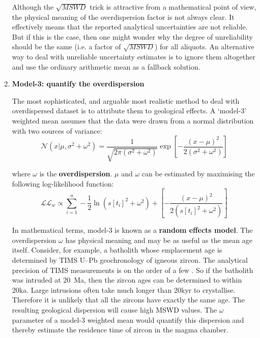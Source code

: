 \begin{refsection}
\begin{enumerate}
  Although the $\sqrt{MSWD}$ trick is attractive from a mathematical
  point of view, the physical meaning of the overdispersion factor is
  not always clear. It effectively means that the reported analytical
  uncertainties are not reliable. But if this is the case, then one
  might wonder why the degree of unreliability should be the same
  (i.e. a factor of $\sqrt{MSWD}$) for all aliquots. An alternative
  way to deal with unreliable uncertainty estimates is to ignore them
  altogether and use the ordinary arithmetic mean as a fallback
  solution.
  
\item\textbf{Model-3: quantify the overdispersion}

  The most sophisticated, and arguable most realistic method to deal
  with overdispersed dataset is to attribute them to geological
  effects. A `model-3' weighted mean assumes that the data were drawn
  from a normal distribution with two sources of variance:
  \begin{equation}
    \mathcal{N}(x|\mu,\sigma^2+\omega^2) =
    \frac{1}{\sqrt{2\pi\left(\sigma^2+\omega^2\right)}}
    \exp\!\left[-\frac{(x-\mu)^2}{2\left(\sigma^2 + \omega^2 \right)}\right]
    \label{eq:overdispersion}
  \end{equation}

\noindent where $\omega$ is the \textbf{overdispersion}. $\mu$ and
$\omega$ can be estimated by maximising the following log-likelihood
function:
  \begin{equation}
    \mathcal{LL}_w \propto \sum\limits_{i=1}^{n}
    - \frac{1}{2}\ln\!\left(s[t_i]^2+\omega^2\right)
    + \left[-\frac{(x-\mu)^2}{2\left(s[t_i]^2 + \omega^2 \right)}\right]
    \label{eq:wtdmean-model-3}
  \end{equation}

In mathematical terms, model-3 is known as a \textbf{random effects
  model}. The overdispersion $\omega$ has physical meaning and may be
as useful as the mean age itself. Consider, for example, a batholith
whose emplacement age is determined by TIMS U--Pb geochronology of
igneous zircon. The analytical precision of TIMS measurements is on
the order of a few \textperthousand. So if the batholith was intruded
at 20~Ma, then the zircon ages can be determined to within 20ka. Large
intrusions often take much longer than 20kyr to crystallise. Therefore
it is unlikely that all the zircons have exactly the same age.  The
resulting geological dispersion will cause high MSWD values.  The
$\omega$ parameter of a model-3 weighted mean would quantify this
dispersion and thereby estimate the residence time of zircon in the
magma chamber.


\end{enumerate}
\end{refsection}

